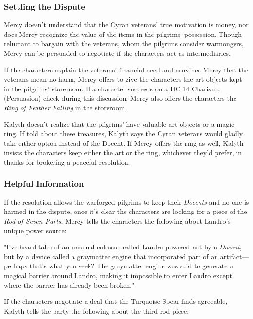 \documentclass[10pt,a4paper,twoside,bg=print,twocolumn,openany,nodeprecatedcode]{dndbook}
\begin{document}
\subsubsection{Settling the Dispute}
Mercy doesn't understand that the Cyran veterans' true motivation is money, nor does Mercy recognize the value of the items in the pilgrims' possession. Though reluctant to bargain with the veterans, whom the pilgrims consider warmongers, Mercy can be persuaded to negotiate if the characters act as intermediaries.

If the characters explain the veterans' financial need and convince Mercy that the veterans mean no harm, Mercy offers to give the characters the art objects kept in the pilgrims' storeroom. If a character succeeds on a DC 14 Charisma (Persuasion) check during this discussion, Mercy also offers the characters the \textit{Ring of Feather Falling} in the storeroom.

Kalyth doesn't realize that the pilgrims' have valuable art objects or a magic ring. If told about these treasures, Kalyth says the Cyran veterans would gladly take either option instead of the Docent. If Mercy offers the ring as well, Kalyth insists the characters keep either the art or the ring, whichever they'd prefer, in thanks for brokering a peaceful resolution.

\subsubsection{Helpful Information}
If the resolution allows the warforged pilgrims to keep their \textit{Docents} and no one is harmed in the dispute, once it's clear the characters are looking for a piece of the \textit{Rod of Seven Parts}, Mercy tells the characters the following about Landro's unique power source:

\begin{DndReadAloud}{}
"I've heard tales of an unusual colossus called Landro powered not by a \textit{Docent}, but by a device called a graymatter engine that incorporated part of an artifact—perhaps that's what you seek? The graymatter engine was said to generate a magical barrier around Landro, making it impossible to enter Landro except where the barrier has already been broken."

\end{DndReadAloud}

If the characters negotiate a deal that the Turquoise Spear finds agreeable, Kalyth tells the party the following about the third rod piece:
\end{document}
